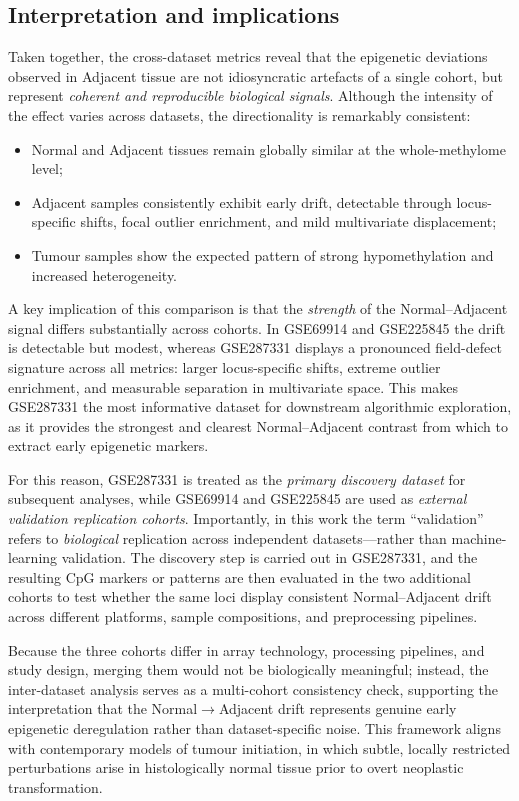 \documentclass[10pt]{extarticle}
\begin{document}
\subsection{Interpretation and implications}

Taken together, the cross-dataset metrics reveal that the epigenetic deviations observed in 
Adjacent tissue are not idiosyncratic artefacts of a single cohort, but represent 
\emph{coherent and reproducible biological signals}.  
Although the intensity of the effect varies across datasets, the directionality is remarkably 
consistent:

\begin{itemize}[label=-]
    \item Normal and Adjacent tissues remain globally similar at the whole-methylome level;
    \item Adjacent samples consistently exhibit early drift, detectable through locus-specific
          shifts, focal outlier enrichment, and mild multivariate displacement;
    \item Tumour samples show the expected pattern of strong hypomethylation and increased 
          heterogeneity.
\end{itemize}

A key implication of this comparison is that the \emph{strength} of the Normal--Adjacent signal 
differs substantially across cohorts.  
In GSE69914 and GSE225845 the drift is detectable but modest, whereas GSE287331 displays a 
pronounced field-defect signature across all metrics: larger locus-specific shifts, extreme 
outlier enrichment, and measurable separation in multivariate space.  
This makes GSE287331 the most informative dataset for downstream algorithmic exploration, as it 
provides the strongest and clearest Normal--Adjacent contrast from which to extract early 
epigenetic markers.

For this reason, GSE287331 is treated as the \emph{primary discovery dataset} for subsequent 
analyses, while GSE69914 and GSE225845 are used as \emph{external validation replication cohorts}.  
Importantly, in this work the term “validation” refers to \emph{biological} replication across 
independent datasets—rather than machine-learning validation.  
The discovery step is carried out in GSE287331, and the resulting CpG markers or patterns are 
then evaluated in the two additional cohorts to test whether the same loci display consistent 
Normal--Adjacent drift across different platforms, sample compositions, and preprocessing 
pipelines. 

Because the three cohorts differ in array technology, processing pipelines, and study design, 
merging them would not be biologically meaningful; instead, the inter-dataset analysis serves as 
a multi-cohort consistency check, supporting the interpretation that the Normal$\rightarrow$Adjacent 
drift represents genuine early epigenetic deregulation rather than dataset-specific noise.  
This framework aligns with contemporary models of tumour initiation, in which subtle, locally 
restricted perturbations arise in histologically normal tissue prior to overt neoplastic 
transformation.






\printbibliography
\end{document}
